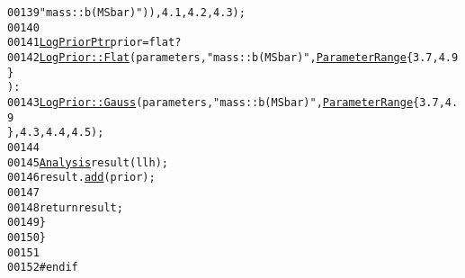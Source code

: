 \begin{footnotesize}
\begin{alltt}
00139                         \textcolor{stringliteral}{"mass::b(MSbar)"})), 4.1, 4.2, 4.3);
00140 
00141         \hyperlink{namespaceeos_ac5481e3b46ee55ff24606ee7f6e78651}{LogPriorPtr} prior = flat ?
00142             \hyperlink{classeos_1_1LogPrior_ad4c2afcb1df01ef6ff1f2f8402cc7636}{LogPrior::Flat}(parameters, \textcolor{stringliteral}{"mass::b(MSbar)"}, \hyperlink{structeos_1_1ParameterRange}{ParameterRange}\{3.7, 4.9\}
       ) :
00143             \hyperlink{classeos_1_1LogPrior_afe99a1c56a9ef60b4c38fe56f3c2b7ae}{LogPrior::Gauss}(parameters, \textcolor{stringliteral}{"mass::b(MSbar)"}, \hyperlink{structeos_1_1ParameterRange}{ParameterRange}\{3.7, 4.9
      \}, 4.3, 4.4, 4.5);
00144 
00145         \hyperlink{classeos_1_1Analysis}{Analysis} result(llh);
00146         result.\hyperlink{classeos_1_1Analysis_a3062ad70d7888517d3fa09e7dcb183cf}{add}(prior);
00147 
00148         \textcolor{keywordflow}{return} result;
00149     \}
00150 \}
00151 
00152 \textcolor{preprocessor}{#endif}
\end{alltt}\end{footnotesize}
